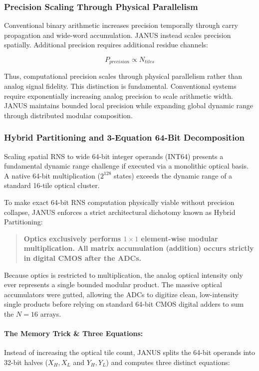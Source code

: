 \documentclass[journal]{IEEEtran}
\begin{document}
\subsubsection{\textbf{Precision Scaling Through Physical Parallelism}}

Conventional binary arithmetic increases precision temporally through carry propagation and wide-word accumulation. JANUS instead scales precision spatially. Additional precision requires additional residue channels:

\begin{equation}
P_{precision} \propto N_{tiles}
\end{equation}

Thus, computational precision scales through physical parallelism rather than analog signal fidelity. This distinction is fundamental. Conventional systems require exponentially increasing analog precision to scale arithmetic width. JANUS maintains bounded local precision while expanding global dynamic range through distributed modular composition.

\subsubsection{\textbf{Hybrid Partitioning and 3-Equation 64-Bit Decomposition}}

Scaling spatial RNS to wide 64-bit integer operands (INT64) presents a fundamental dynamic range challenge if executed via a monolithic optical basis. A native 64-bit multiplication ($2^{128}$ states) exceeds the dynamic range of a standard 16-tile optical cluster.

To make exact 64-bit RNS computation physically viable without precision collapse, JANUS enforces a strict architectural dichotomy known as Hybrid Partitioning:

\begin{quote}
\textbf{Optics exclusively performs $1 \times 1$ element-wise modular multiplication. All matrix accumulation (addition) occurs strictly in digital CMOS after the ADCs.}
\end{quote}

Because optics is restricted to multiplication, the analog optical intensity only ever represents a single bounded modular product. The massive optical accumulators were gutted, allowing the ADCs to digitize clean, low-intensity single products before relying on standard 64-bit CMOS digital adders to sum the $N=16$ arrays.

\paragraph{\textbf{The Memory Trick \& Three Equations:}}
Instead of increasing the optical tile count, JANUS splits the 64-bit operands into 32-bit halves ($X_H, X_L$ and $Y_H, Y_L$) and computes three distinct equations:
\end{document}
